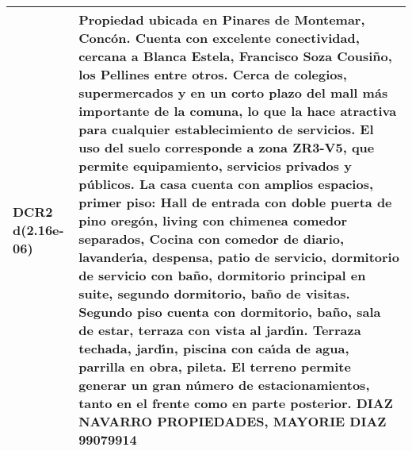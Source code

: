 \begin{table}[H]
\begin{tabular}{|l|m{35em}|}
\hline DCR2 d(2.16e-06) & Propiedad ubicada en Pinares de Montemar, Conc\'on. Cuenta con excelente conectividad, cercana a Blanca Estela, Francisco Soza Cousi\~no, los Pellines entre otros. Cerca de colegios, supermercados y en un corto plazo del mall m\'as importante de la comuna, lo que la hace atractiva para cualquier establecimiento de servicios. El uso del suelo corresponde a zona ZR3-V5, que permite equipamiento, servicios privados y p\'ublicos.  La casa cuenta con amplios espacios, primer piso: Hall de entrada con doble puerta de pino oreg\'on, living con chimenea comedor separados, Cocina con comedor de diario, lavander{\'\i}a, despensa, patio de servicio, dormitorio de servicio con ba\~no, dormitorio principal en suite, segundo dormitorio, ba\~no de visitas. Segundo piso cuenta con dormitorio, ba\~no, sala de estar, terraza con vista al jard{\'\i}n.  Terraza techada, jard{\'\i}n, piscina con ca{\'\i}da de agua, parrilla en obra, pileta.  El terreno permite generar un gran n\'umero de estacionamientos, tanto en el frente como en parte posterior.  DIAZ NAVARRO PROPIEDADES, MAYORIE DIAZ 99079914 \\
\hline
\end{tabular}
\end{table}
